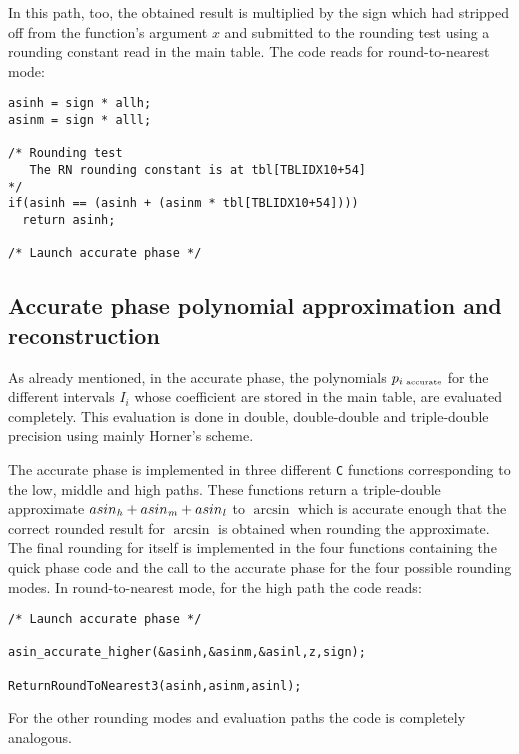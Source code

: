 In this path, too, the obtained result is multiplied by the sign which
had stripped off from the function's argument $x$ and submitted to the
rounding test using a rounding constant read in the main table. The
code reads for round-to-nearest mode:
\begin{lstlisting}[caption={Multiplication of the function's sign, rounding test (round-to-nearest)},firstnumber=1]
asinh = sign * allh;
asinm = sign * alll;

/* Rounding test 
   The RN rounding constant is at tbl[TBLIDX10+54]
*/
if(asinh == (asinh + (asinm * tbl[TBLIDX10+54]))) 
  return asinh;

/* Launch accurate phase */
\end{lstlisting} 
\subsection{Accurate phase polynomial approximation and reconstruction}\label{subsec:asinaccupolynomial}
As already mentioned, in the accurate phase, the polynomials
$p_{i\mbox{\tiny ~accurate}}$ for the different intervals $I_i$ whose
coefficient are stored in the main table, are evaluated completely.
This evaluation is done in double, double-double and triple-double
precision using mainly Horner's scheme.

The accurate phase is implemented in three different {\tt C} functions
corresponding to the low, middle and high paths. These functions
return a triple-double approximate $asin_{\mathit{h}} + asin_{\mathit{m}} + asin_{\mathit{l}}$ to
$\arcsin$ which is accurate enough that the correct rounded result for
$\arcsin$ is obtained when rounding the approximate.  The final
rounding for itself is implemented in the four functions containing
the quick phase code and the call to the accurate phase for the four
possible rounding modes. In round-to-nearest mode, for the high path
the code reads:
\begin{lstlisting}[caption={Final rounding of the accurate phase result (RN)},firstnumber=1]
/* Launch accurate phase */

asin_accurate_higher(&asinh,&asinm,&asinl,z,sign);

ReturnRoundToNearest3(asinh,asinm,asinl); 
\end{lstlisting}
For the other rounding modes and evaluation paths the code is
completely analogous.

